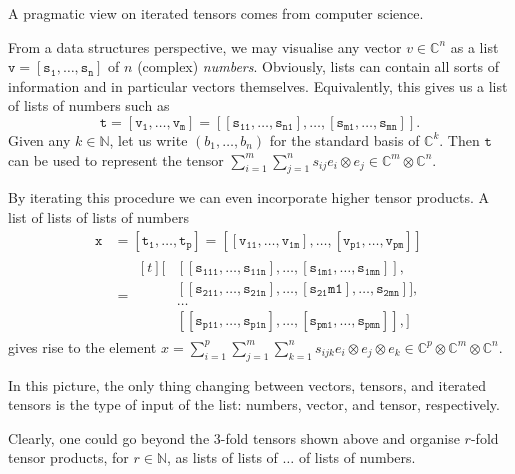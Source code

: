 \documentclass[a4paper,oneside, 12pt]{amsart}
\begin{document}
A pragmatic view on iterated tensors comes from computer science.
\begin{remark}\label{rem:tensors-as-lists-of-lists-of-lists}
  From a data structures perspective, we may visualise any vector \(v\in \mathbb{C}^{n}\) as a list \(\mathtt{ v = [s_{1}, \dots , s_{n}]}\) of \(n\) (complex) \emph{numbers}.
  Obviously, lists can contain all sorts of information and in particular vectors themselves.
  Equivalently, this gives us a list of lists of numbers such as
  \begin{equation*}
    \mathtt{t} = \mathtt{[v_{1}, \dots , v_{m}]}
    = \mathtt{[[s_{11}, \dots , s_{n1}], \dots , [s_{m1}, \dots , s_{mn}]]}.
  \end{equation*}
  Given any \(k\in \mathbb{N}\), let us write \((b_{1}, \dots , b_{n})\) for the standard basis of \( \mathbb{C}^{k}\).
  Then \(\mathtt{t}\) can be used to represent the tensor \(\sum_{i=1}^{m}\sum_{j=1}^{n} s_{ij}e_{i}\otimes e_{j} \in \mathbb{C}^{m}\otimes \mathbb{C}^{n}\).

  By iterating this procedure we can even incorporate higher tensor products.
  A list of lists of lists of numbers
  \begin{align*}
    \mathtt{
      x} & = \mathtt{[t_{1}, \dots , t_{p}]}
          =  \mathtt{[[v_{11}, \dots , v_{1m}], \dots , [v_{p1}, \dots , v_{pm}]]} \\
         & =
           \begin{aligned}[t]
              \mathtt{[}
             & \mathtt{[[s_{111}, \dots , s_{11n}], \dots , [s_{1m1}, \dots , s_{1mn}]],} \\
             & \mathtt{[[s_{211}, \dots , s_{21n}], \dots , [s_21m1], \dots , s_{2mn}]],} \\
             & \mathtt{\dots} \\
             & \mathtt{[[s_{p11}, \dots , s_{p1n}], \dots , [s_{pm1}, \dots , s_{pmn}]],}
               \mathtt{]}
           \end{aligned}
  \end{align*}
  gives rise to the element \(x = \sum_{i=1}^{p}\sum_{j=1}^{m}\sum_{k=1}^{n} s_{ijk} e_{i}\otimes e_{j} \otimes e_{k} \in \mathbb{C}^{p} \otimes \mathbb{C}^{m} \otimes \mathbb{C}^{n}\).

  In this picture, the only thing changing between vectors, tensors, and iterated tensors  is the type of input of the list: numbers, vector, and tensor, respectively.

  Clearly, one could go beyond the \(3\)-fold tensors shown above and organise  \(r\)-fold tensor products, for \(r\in \mathbb{N}\), as lists of lists of \(\dots\)  of lists of numbers.


\end{remark}
\end{document}
